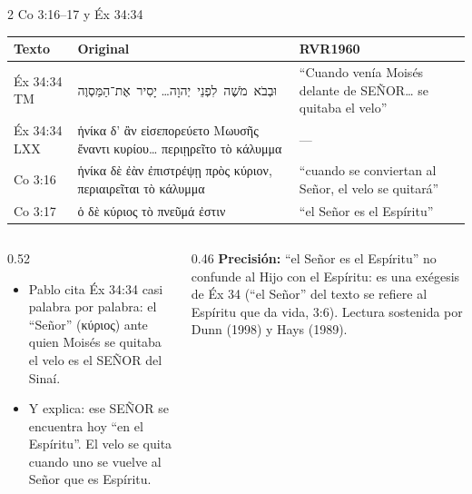\documentclass[hyperref={bookmarks=false},aspectratio=169]{beamer}
\newcommand{\heb}[1]{\mbox{\foreignlanguage{hebrew}{#1}}}
\newcommand{\grc}[1]{\foreignlanguage{ancientgreek}{#1}}
\newcommand{\SENOR}{S{\fontsize{0.78em}{1em}\selectfont EÑOR}}
\newcommand{\precision}[1]{{\footnotesize\color{gris}\textbf{Precisión:} #1}}
\begin{document}
\begin{frame}{2 Co 3:16--17 y Éx 34:34}
\scriptsize\renewcommand{\arraystretch}{1.15}
\begin{tabular}{@{}>{\RaggedRight\arraybackslash}p{1.6cm}>{\RaggedRight\arraybackslash}p{5.6cm}>{\RaggedRight\arraybackslash}p{4.6cm}@{}}
\toprule
\textbf{Texto} & \textbf{Original} & \textbf{RVR1960} \\ \midrule
Éx 34:34 TM & \heb{וּבְבֹא מֹשֶׁה לִפְנֵי יְהוָה}\ldots{} \heb{יָסִיר אֶת־הַמַּסְוֶה} & ``Cuando venía Moisés delante de \SENOR\ldots{} se quitaba el velo'' \\
Éx 34:34 LXX & \grc{ἡνίκα δ’ ἂν εἰσεπορεύετο Μωυσῆς ἔναντι κυρίου\ldots{} περιῃρεῖτο τὸ κάλυμμα} & --- \\
2 Co 3:16 & \grc{ἡνίκα δὲ ἐὰν ἐπιστρέψῃ πρὸς κύριον, περιαιρεῖται τὸ κάλυμμα} & ``cuando se conviertan al Señor, el velo se quitará'' \\
2 Co 3:17 & \grc{ὁ δὲ κύριος τὸ πνεῦμά ἐστιν} & ``el Señor es el Espíritu'' \\
\bottomrule
\end{tabular}\par\medskip
\begin{columns}[t,onlytextwidth]
\begin{column}{0.52\textwidth}\small
\begin{itemize}
\item Pablo cita Éx 34:34 casi palabra por palabra: el ``Señor'' (\grc{κύριος}) ante quien Moisés se quitaba el velo es el \SENOR{} del Sinaí.
\item Y explica: ese \SENOR{} se encuentra hoy ``en el Espíritu''. El velo se quita cuando uno se vuelve al Señor que es Espíritu.
\end{itemize}
\end{column}
\begin{column}{0.46\textwidth}
\precision{``el Señor es el Espíritu'' no confunde al Hijo con el Espíritu: es una exégesis de Éx 34 (``el Señor'' del texto se refiere al Espíritu que da vida, 3:6). Lectura sostenida por Dunn (1998) y Hays (1989).}
\end{column}
\end{columns}
\end{frame}
\end{document}
